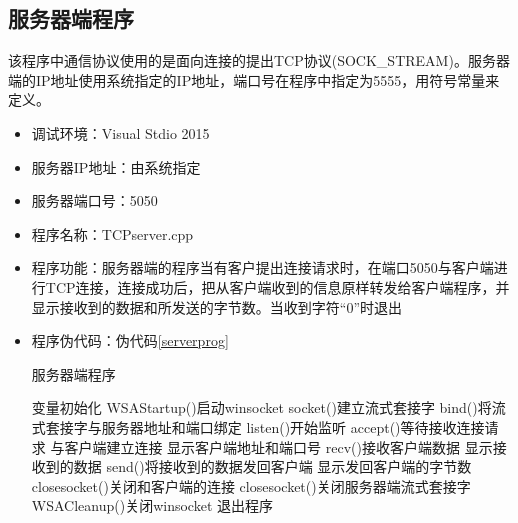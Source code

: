 \documentclass[a4paper]{ctexrep}
\begin{document}
\begin{spacing}{1.5}
\subsection{服务器端程序}
该程序中通信协议使用的是面向连接的提出TCP协议(SOCK\_STREAM)。服务器端的IP地址使用系统指定的IP地址，端口号在程序中指定为5555，用符号常量来定义。
\begin{itemize}
	\item 调试环境：Visual Stdio 2015
	\item 服务器IP地址：由系统指定
	\item 服务器端口号：5050
	\item 程序名称：TCPserver.cpp
	\item 程序功能：服务器端的程序当有客户提出连接请求时，在端口5050与客户端进行TCP连接，连接成功后，把从客户端收到的信息原样转发给客户端程序，并显示接收到的数据和所发送的字节数。当收到字符“0”时退出
	\item 程序伪代码：伪代码\ref{serverprog}
	\begin{algorithm}[h]
		\caption{服务器端程序}\label{serverprog}
		\begin{algorithmic}[1]
			\State 变量初始化
			\State WSAStartup()启动winsocket
			\State socket()建立流式套接字
			\State bind()将流式套接字与服务器地址和端口绑定
			\State listen()开始监听
			\State accept()等待接收连接请求
			\State 与客户端建立连接
			\Ensure 显示客户端地址和端口号
			\Repeat
			\State recv()接收客户端数据
			\Ensure 显示接收到的数据
			\State send()将接收到的数据发回客户端
			\Ensure 显示发回客户端的字节数
			\State closesocket()关闭和客户端的连接
			\State closesocket()关闭服务器端流式套接字
			\State WSACleanup()关闭winsocket
			\State 退出程序
		\end{algorithmic}
	\end{algorithm}
\end{itemize}

\end{spacing}
\end{document}
